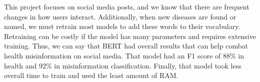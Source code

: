 This project focuses on social media posts, and we know that there are frequent changes in how users interact. Additionally, when new diseases are found or named, we must retrain most
models to add these words to their vocabulary. Retraining can be costly if the model has many parameters and requires extensive training. Thus, we can say that BERT had overall results
that can help combat health misinformation on social media. That model had an F1 score of 88\% in health and 92\% in misinformation classification. Finally, that model took less overall time
to train and used the least amount of RAM.










